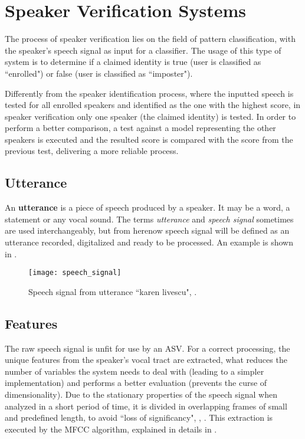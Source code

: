 \chapter{Speaker Verification Systems}
\label{ch:speaker-recognition-systems}


The process of speaker verification lies on the field of pattern classification, with the speaker's speech signal as input for a classifier. The usage of this type of system is to determine if a claimed identity is true (user is classified as ``enrolled") or false (user is classified as ``imposter").

Differently from the speaker identification process, where the inputted speech is tested for all enrolled speakers and identified as the one with the highest score, in speaker verification only one speaker (the claimed identity) is tested. In order to perform a better comparison, a test against a model representing the other speakers is executed and the resulted score is compared with the score from the previous test, delivering a more reliable process.

\section{Utterance}

An \textbf{utterance} is a piece of speech produced by a speaker. It may be a word, a statement or any vocal sound. The terms \emph{utterance} and \emph{speech signal} sometimes are used interchangeably, but from herenow speech signal will be defined as an utterance recorded, digitalized and ready to be processed. An example is shown in .

\begin{figure}[ht]
    \centering
    \texttt{[image: speech\_signal]}
    \caption{Speech signal from utterance ``karen livescu", .}
    \label{fig:speech_signal}
\end{figure}

\section{Features}

The raw speech signal is unfit for use by an ASV. For a correct processing, the unique features from the speaker's vocal tract are extracted, what reduces the number of variables the system needs to deal with (leading to a simpler implementation) and performs a better evaluation (prevents the curse of dimensionality). Due to the stationary properties of the speech signal when analyzed in a short period of time, it is divided in overlapping frames of small and predefined length, to avoid ``loss of significancy", , . This extraction is executed by the MFCC algorithm, explained in details in .

